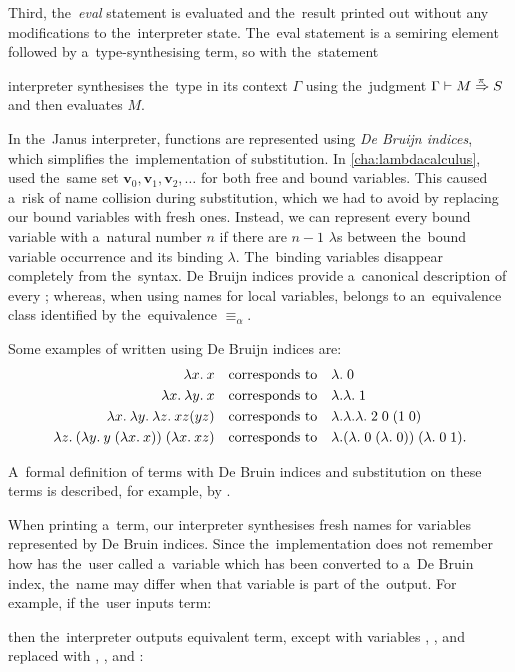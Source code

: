 Third, the~\emph{eval} statement is evaluated and the~result printed out without
any modifications to the~interpreter state. The~eval statement is a semiring
element followed by a~type-synthesising term, so with the~statement
\begin{center}
\end{center}
interpreter synthesises the~type in its context $\Gamma$ using the~judgment
$\Gamma \vdash M \overset{\!{\pi}}\Rightarrow S$ and then evaluates $M$.


In the~Janus interpreter, functions are represented using
\emph{De Bruijn indices}, which simplifies the~implementation of substitution.
In \autoref{cha:lambdacalculus}, \lts used the~same set
$\mathbf{v}_0, \mathbf{v}_1, \mathbf{v}_2, \dots$ for both free and bound
variables. This caused a~risk of name collision during substitution, which we
had to avoid by replacing our bound variables with fresh ones. Instead, we can
represent every bound variable with a~natural number $n$ if there are $n-1$
$\lambda$s between the~bound variable occurrence and its binding $\lambda$.
The~binding variables disappear completely from the~syntax. De Bruijn indices
provide a~canonical description of every \lt; whereas, when using names for
local variables, \lt belongs to an~equivalence class identified by
the~equivalence $\equiv_\alpha$.

Some examples of \lts written using De Bruijn indices are:
\begin{align*}
  \lambda x . \: x \quad &\text{corresponds to} \quad \lambda. \; 0 \\
  \lambda x . \: \lambda y . \: x \quad &\text{corresponds to} \quad \lambda. \lambda. \; 1 \\
  \lambda x . \: \lambda y . \: \lambda z . \: x z (y z) \quad &\text{corresponds to} \quad
    \lambda. \lambda. \lambda. \; 2 \; 0 \; (1 \; 0) \\
  \lambda z . \: (\lambda y . \: y \; (\lambda x . \: x))\;(\lambda x . \: x z)\quad&\text{corresponds to}
    \quad \lambda. (\lambda. \; 0 \; (\lambda. \; 0)) \; (\lambda. \; 0 \; 1).
\end{align*}

A~formal definition of terms with De Bruin indices and substitution on these
terms is described, for example, by \citet[Chapter~6]{pierce_2002}.

When printing a~term, our interpreter synthesises fresh names for variables
represented by De Bruin indices. Since the~implementation does not remember how
has the~user called a~variable which has been converted to a~De Bruin index,
the~name may differ when that variable is part of the~output. For example, if
the~user inputs term:
\begin{center}
\end{center}
then the~interpreter outputs equivalent term, except with variables
, , and  replaced with
, , and :

